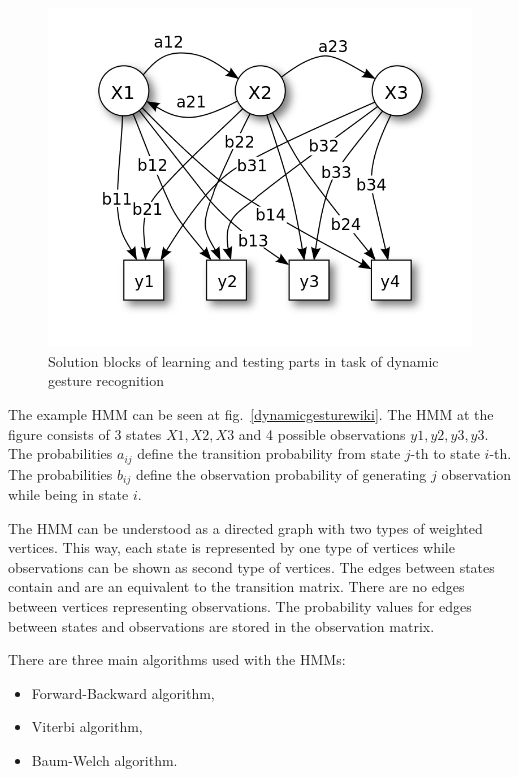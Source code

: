 \begin{figure}[htb]
\centering
 \includegraphics[width=0.8\columnwidth]{figures/HMM_wiki.png}
 \caption[]{Solution blocks of learning and testing parts in task of dynamic gesture recognition\footnotemark}
 \label{dynamicgestureswiki}
\end{figure}


The example HMM can be seen at fig.~\ref{dynamicgesturewiki}.
The HMM at the figure consists of 3 states ${X1, X2, X3}$ and 4 possible observations ${y1, y2, y3, y3}$.
The probabilities $a_{ij}$ define the transition probability from state $j$-th to state $i$-th. 
The probabilities $b_{ij}$ define the observation probability of generating $j$ observation while being in state $i$.

The HMM can be understood as a directed graph with two types of weighted vertices. 
This way, each state is represented by one type of vertices while observations can be shown as second type of vertices.
The edges between states contain and are an equivalent to the transition matrix. 
There are no edges between vertices representing observations.
The probability values for edges between states and observations are stored in the observation matrix.

There are three main algorithms used with the HMMs:
\begin{itemize}
\item Forward-Backward algorithm, 
\item Viterbi algorithm,
\item Baum-Welch algorithm.
\end{itemize}

